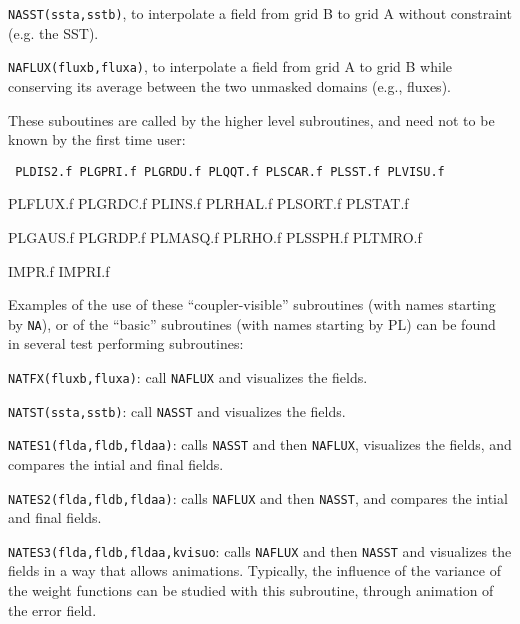 \medskip



\item{} {\tt NASST(ssta,sstb)}, to interpolate a field from grid B to
grid A without constraint
(e.g. the SST). 

\medskip

\item{} {\tt NAFLUX(fluxb,fluxa)}, to interpolate a field from grid A to
grid B while conserving
its average between the two unmasked domains (e.g., fluxes). 

\medskip
\medskip
{} 
 \medskip

These suboutines are called by the higher level subroutines, and need not to
be known by the first time user:


{\tt
PLDIS2.f  PLGPRI.f  PLGRDU.f  PLQQT.f   PLSCAR.f  PLSST.f   PLVISU.f


PLFLUX.f  PLGRDC.f  PLINS.f   PLRHAL.f  PLSORT.f  PLSTAT.f


PLGAUS.f  PLGRDP.f  PLMASQ.f  PLRHO.f   PLSSPH.f  PLTMRO.f


IMPR.f   IMPRI.f
}

\medskip
\medskip
{} 
 \medskip


Examples of the use of these ``coupler-visible'' subroutines (with names
starting by {\tt NA}), or of the ``basic'' subroutines (with names starting by PL)
can be found in several test performing subroutines: 

\medskip

\item{} {\tt NATFX(fluxb,fluxa)}:
 call {\tt NAFLUX} and visualizes the fields.

\medskip

\item{} {\tt NATST(ssta,sstb)}: call {\tt NASST} and visualizes the fields.

\medskip

\item{} {\tt NATES1(flda,fldb,fldaa)}: calls 
{\tt NASST} and then {\tt NAFLUX}, visualizes the fields, and compares the
intial and final fields.  

\medskip

\item{} {\tt NATES2(flda,fldb,fldaa)}:  calls
  {\tt NAFLUX} and then {\tt NASST}, and compares the
intial and final fields. 
\medskip

\item{} {\tt NATES3(flda,fldb,fldaa,kvisuo}: calls  
  {\tt NAFLUX} and  then {\tt NASST} and visualizes the fields in a way that
allows animations. 
Typically, the influence of the variance of the weight functions can be
studied with this subroutine, through animation of the error field. 


